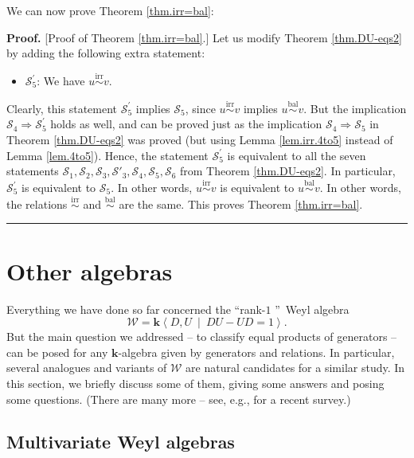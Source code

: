 \documentclass[numbers=enddot,12pt,final,onecolumn,notitlepage]{scrartcl}%
\theoremstyle{definition}
\newenvironment{proof}[1][Proof]{\noindent\textbf{#1.} }{\ \rule{0.5em}{0.5em}}
\newcommand{\W}{\mathcal{W}}
\newcommand{\kk}{\mathbf{k}}
\newcommand{\balsim}{\overset{\operatorname*{bal}}{\sim}}
\newcommand{\irrsim}{\overset{\operatorname*{irr}}{\sim}}
\begin{document}
We can now prove Theorem \ref{thm.irr=bal}:

\begin{proof}
[Proof of Theorem \ref{thm.irr=bal}.] Let us modify Theorem \ref{thm.DU-eqs2}
by adding the following extra statement:

\begin{itemize}
\item $\mathcal{S}_{5}^{\prime}$: We have $u\irrsim v$.
\end{itemize}

Clearly, this statement $\mathcal{S}_{5}^{\prime}$ implies $\mathcal{S}_{5}$,
since $u\irrsim v$ implies $u\balsim v$. But the implication $\mathcal{S}%
_{4}\Longrightarrow\mathcal{S}_{5}^{\prime}$ holds as well, and can be proved
just as the implication $\mathcal{S}_{4}\Longrightarrow\mathcal{S}_{5}$ in
Theorem \ref{thm.DU-eqs2} was proved (but using Lemma \ref{lem.irr.4to5} instead of
Lemma \ref{lem.4to5}). Hence, the statement $\mathcal{S}_{5}^{\prime}$ is
equivalent to all the seven statements
$\mathcal{S}_{1},\mathcal{S}_{2},\mathcal{S}_{3},\mathcal{S}'_3,\mathcal{S}_{4},\mathcal{S}_{5}, \mathcal{S}_6$
from Theorem \ref{thm.DU-eqs2}.
In
particular, $\mathcal{S}_{5}^{\prime}$ is equivalent to $\mathcal{S}_{5}$. In
other words, $u\irrsim v$ is equivalent to $u\balsim v$. In other words, the
relations $\irrsim$ and $\balsim$ are the same. This proves Theorem
\ref{thm.irr=bal}.
\end{proof}

\section{Other algebras}\label{sec:otheralg}

Everything we have done so far concerned the \textquotedblleft rank-$1$%
\textquotedblright\ Weyl algebra
\[
\W=\kk\left\langle
D,U\ \mid\ DU-UD=1\right\rangle.
\]
But the main question we addressed -- to
classify equal products of generators -- can be posed for any $\kk%
$-algebra given by generators and relations. In particular, several analogues
and variants of $\W$ are natural candidates for a
similar study. In this section, we briefly discuss some of them, giving some
answers and posing some questions.
(There are many more -- see, e.g., \cite{Gaddis23} for a recent survey.)

\subsection{Multivariate Weyl algebras}
\end{document}
